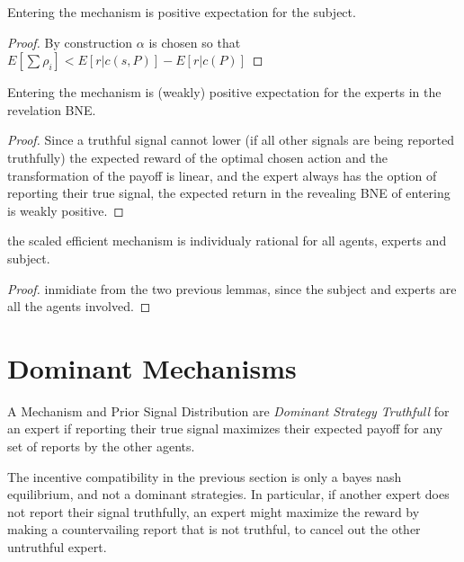 \begin{lem}
	Entering the mechanism is positive expectation for the subject.
\end{lem}

\begin{proof}
  By construction $\alpha$ is chosen so that $E[\sum \rho_i] < E[r|c(s,P)] - E[r|c(P)]$
\end{proof}


\begin{lem}
	Entering the mechanism is (weakly) positive expectation for the experts in the revelation BNE.
\end{lem}

\begin{proof}
Since a truthful signal cannot lower (if all other signals are being reported truthfully) the expected reward of the optimal chosen action and the transformation of the payoff is linear, and the expert always has the option of reporting their true signal, the expected return in the revealing BNE of entering is weakly positive.
\end{proof}


\begin{thm}
	the scaled efficient mechanism is individualy rational for all agents, experts and subject.
\end{thm}

\begin{proof}
inmidiate from the two previous lemmas, since the subject and experts are all the agents involved.
\end{proof}




\section{Dominant Mechanisms}

\begin{defn}
	A Mechanism and Prior Signal Distribution are \emph{Dominant Strategy Truthfull} for an expert if reporting their true signal maximizes their expected payoff for any set of reports by the other agents. 
\end{defn}

The incentive compatibility in the previous section is only a bayes nash equilibrium, and not a dominant strategies. In particular, if another expert does not report their signal truthfully, an expert might maximize the reward by making a countervailing report that is not truthful, to cancel out the other untruthful expert. 

